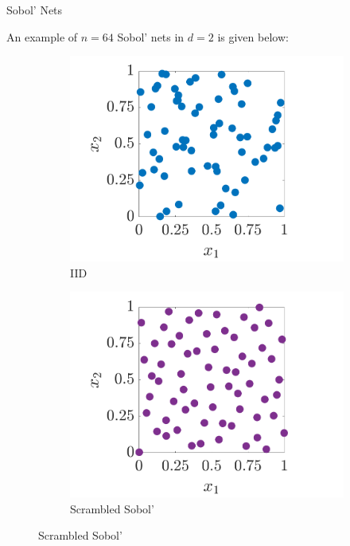 \documentclass[handout, 10pt,compress,xcolor={usenames,dvipsnames}]{beamer} %
\begin{document}
\begin{frame}{Sobol' Nets}

An example of $n=64$ Sobol' nets in $d=2$ is given below:	

	\vspace{-3ex}
	\begin{figure}[htp]
		\centering
		\begin{subfigure}[b]{0.48\textwidth}
			\includegraphics[width=\textwidth]{../figures/IIDPoints}
			\caption{IID}
		\end{subfigure}
		\centering
		\begin{subfigure}[b]{0.48\textwidth}
			\includegraphics[width=\textwidth]{../figures/SSobolPoints}
			\caption{Scrambled Sobol'}
		\end{subfigure}
	\end{figure}
\end{frame}
\end{document}
